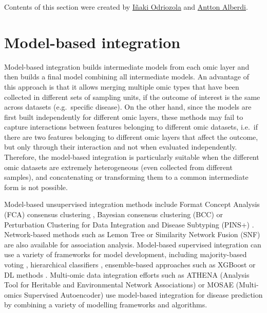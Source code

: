 \documentclass[
]{book}
\begin{document}
Contents of this section were created by \protect\hyperlink{inaki-odriozola}{Iñaki Odriozola} and \protect\hyperlink{antton-alberdi}{Antton Alberdi}.

\hypertarget{multi-staged-omics-integration-model-based}{%
\section{Model-based integration}\label{multi-staged-omics-integration-model-based}}

Model-based integration builds intermediate models from each omic layer and then builds a final model combining all intermediate models. An advantage of this approach is that it allows merging multiple omic types that have been collected in different sets of sampling units, if the outcome of interest is the same across datasets (e.g.~specific disease). On the other hand, since the models are first built independently for different omic layers, these methods may fail to capture interactions between features belonging to different omic datasets, i.e.~if there are two features belonging to different omic layers that affect the outcome, but only through their interaction and not when evaluated independently. Therefore, the model-based integration is particularly suitable when the different omic datasets are extremely heterogeneous (even collected from different samples), and concatenating or transforming them to a common intermediate form is not possible.

Model-based unsupervised integration methods include Format Concept Analysis (FCA) consensus clustering \citep{Hristoskova2014-pj}, Bayesian consensus clustering (BCC) \citep{Lock2013-uq} or Perturbation Clustering for Data Integration and Disease Subtyping (PINS+) \citep{Nguyen2019-pv}. Network-based methods such as Lemon Tree \citep{Bonnet2015-ff} or Similarity Network Fusion (SNF) \citep{Wang2014-jz} are also available for association analysis. Model-based supervised integration can use a variety of frameworks for model development, including majority-based voting \citep{Draghici2003-ht}, hierarchical classifiers \citep{Bavafaye_Haghighi2019-ee}, ensemble-based approaches such as XGBoost \citep{Ma2020-ce} or DL methods \citep{Poirion2020-cn}. Multi-omic data integration efforts such as ATHENA (Analysis Tool for Heritable and Environmental Network Associations) \citep{Holzinger2014-mn} or MOSAE (Multi-omics Supervised Autoencoder) \citep{Tan2020-lq} use model-based integration for disease prediction by combining a variety of modelling frameworks and algorithms.
\end{document}
